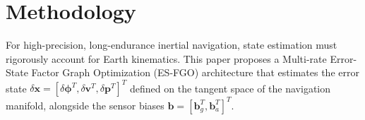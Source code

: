\documentclass[journal]{IEEEtran}
\begin{document}
	
	\section{Methodology}
	
	For high-precision, long-endurance inertial navigation, state estimation must rigorously account for Earth kinematics. This paper proposes a Multi-rate Error-State Factor Graph Optimization (ES-FGO) architecture that estimates the error state $\delta \bm{x} = [\delta \bm{\phi}^T, \delta \bm{v}^T, \delta \bm{p}^T]^T$ defined on the tangent space of the navigation manifold, alongside the sensor biases $\bm{b} = [\bm{b}_g^T, \bm{b}_a^T]^T$.
	
\end{document}

